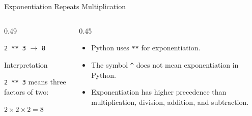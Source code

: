 \documentclass[aspectratio=169,10pt]{beamer}
\begin{document}
\begin{frame}{Exponentiation Repeats Multiplication}

  \begin{columns}[T,onlytextwidth]

    \begin{column}{0.49\textwidth}

      \begin{center}

        {\LARGE \texttt{2 ** 3} $\rightarrow$ \texttt{8}}

      \end{center}

      \begin{block}{Interpretation}

        \texttt{2 ** 3} means three factors of two:

        \begin{center}
          $2 \times 2 \times 2 = 8$
        \end{center}

      \end{block}

    \end{column}

    \begin{column}{0.45\textwidth}

      \begin{itemize}

        \item Python uses \texttt{**} for exponentiation.

        \item The symbol \texttt{\string^} does not mean exponentiation in Python.

        \item Exponentiation has higher precedence than multiplication, division, addition, and subtraction.

      \end{itemize}

    \end{column}

  \end{columns}

\end{frame}

\end{document}

